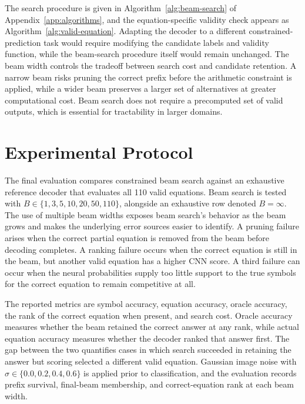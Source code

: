 \documentclass[12pt]{article}
\newcounter{algorithm}
\begin{document}
The search procedure is given in Algorithm~\ref{alg:beam-search} of Appendix~\ref{app:algorithms}, and the equation-specific validity check appears as Algorithm~\ref{alg:valid-equation}. Adapting the decoder to a different constrained-prediction task would require modifying the candidate labels and validity function, while the beam-search procedure itself would remain unchanged. The beam width controls the tradeoff between search cost and candidate retention. A narrow beam risks pruning the correct prefix before the arithmetic constraint is applied, while a wider beam preserves a larger set of alternatives at greater computational cost. Beam search does not require a precomputed set of valid outputs, which is essential for tractability in larger domains.

\section{Experimental Protocol}
The final evaluation compares constrained beam search against an exhaustive reference decoder that evaluates all 110 valid equations. Beam search is tested with $B \in \{1,3,5,10,20,50,110\}$, alongside an exhaustive row denoted $B=\infty$. The use of multiple beam widths exposes beam search's behavior as the beam grows and makes the underlying error sources easier to identify. A pruning failure arises when the correct partial equation is removed from the beam before decoding completes. A ranking failure occurs when the correct equation is still in the beam, but another valid equation has a higher CNN score. A third failure can occur when the neural probabilities supply too little support to the true symbols for the correct equation to remain competitive at all.

The reported metrics are symbol accuracy, equation accuracy, oracle accuracy, the rank of the correct equation when present, and search cost. Oracle accuracy measures whether the beam retained the correct answer at any rank, while actual equation accuracy measures whether the decoder ranked that answer first. The gap between the two quantifies cases in which search succeeded in retaining the answer but scoring selected a different valid equation. Gaussian image noise with $\sigma \in \{0.0, 0.2, 0.4, 0.6\}$ is applied prior to classification, and the evaluation records prefix survival, final-beam membership, and correct-equation rank at each beam width.
\end{document}
